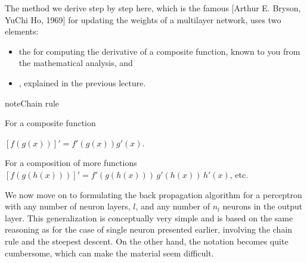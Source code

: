 \documentclass[letterpaper,10pt,english]{jupyterBook}
\begin{document}
\sphinxAtStartPar
The method we derive step by step here, which is the famous  {[}Arthur E. Bryson, Yu\sphinxhyphen{}Chi Ho, 1969{]} for updating the weights of a multi\sphinxhyphen{}layer network, uses two elements:
\begin{itemize}
\item {} 
\sphinxAtStartPar
the  for computing the derivative of a composite function, known to you from the mathematical analysis, and

\item {} 
\sphinxAtStartPar
{}, explained in the previous lecture.

\end{itemize}

\begin{sphinxadmonition}{note}{Chain rule}

\sphinxAtStartPar
For a composite function

\sphinxAtStartPar
\([f(g(x))]' = f'(g(x)) g'(x)\).

\sphinxAtStartPar
For a composition of more functions \([f(g(h(x)))]' = f'(g(h(x))) \,g'(h(x)) \,h'(x)\), etc.
\end{sphinxadmonition}

\sphinxAtStartPar
We now move on to formulating the back propagation algorithm for a perceptron with any number of neuron layers, \(l\), and any number of \(n_l\) neurons in the output layer. This generalization is conceptually very simple and is based on the same reasoning as for the case of single neuron presented earlier, involving the chain rule and the steepest descent. On the other hand, the notation becomes quite cumbersome, which can make the material seem difficult.
\end{document}
